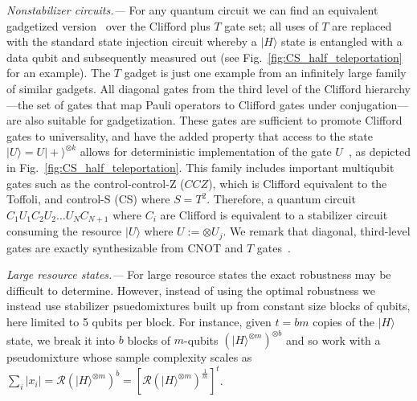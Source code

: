 \documentclass[aps,prl,twocolumn,showpacs,superscriptaddress,groupedaddress,amsmath,amssymb]{revtex4-1}  %
\def\ket #1{\vert #1\rangle}
\begin{document}
\noindent\textit{Nonstabilizer circuits.---}  For any quantum circuit we can find an equivalent gadgetized version~\cite{bravyi_universal_2005,bravyi_improved_2016,bravyi_trading_2016} over the Clifford plus $T$ gate set; all uses of $T$ are replaced with the standard state injection circuit whereby a $\ket{H}$ state is entangled with a data qubit and subsequently measured out (see Fig.~\ref{fig:CS_half_teleportation} for an example). The $T$ gadget is just one example from an infinitely large family of similar gadgets.   All diagonal gates from the third level of the Clifford hierarchy---the set of gates that map Pauli operators to Clifford gates under conjugation---are also suitable for gadgetization. These gates are sufficient to promote Clifford gates to universality, and have the added property that access to the state $\ket{U}=U\ket{+}^{\otimes k}$ allows for deterministic implementation of the gate $U$~\cite{gottesman_demonstrating_1999,zhou_methodology_2000}, as depicted in Fig.~\ref{fig:CS_half_teleportation}.  This family includes important multiqubit gates such as the control-control-Z ($CCZ$), which is Clifford equivalent to the Toffoli, and control-S (CS) where $S=T^2$. Therefore, a quantum circuit $C_1 U_1 C_2 U_2 \ldots U_N C_{N+1}$ where $C_i$ are Clifford is equivalent to a stabilizer circuit consuming the resource $\ket{U}$ where $U:=\otimes U_j$. We remark that diagonal, third-level gates are exactly synthesizable from CNOT and $T$ gates~\cite{amy_polynomial-time_2014,amy_t-count_2016,campbell_unified_2016,campbell_unifying_2016}.

\noindent\textit{Large resource states.---} For large resource states the exact robustness may be difficult to determine.  However,  instead of using the optimal robustness we instead use stabilizer psuedomixtures built up from constant size blocks of qubits, here limited to 5 qubits per block.  For instance, given $t=bm$ copies of the $\ket{H}$ state, we break it into $b$ blocks of $m$-qubits $(\ket{H}^{\otimes m})^{\otimes b}$ and so work with a pseudomixture whose sample complexity scales as $\sum_i|x_i| =  \mathcal{R}( \ket{H}^{\otimes m} )^b=\left[\mathcal{R}( \ket{H}^{\otimes m} )^{\frac{1}{m}}\right]^t $. 
\end{document}
